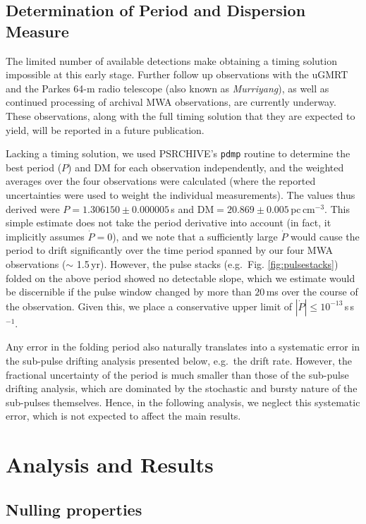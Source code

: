 \documentclass[twocolumn]{aastex631}
\newcommand{\psrdm}{20.869}
\newcommand{\psrdmerr}{0.005}
\newcommand{\dmunit}{pc$\,$cm$^{-3}$}
\begin{document}
\subsection{Determination of Period and Dispersion Measure}
\label{sec:period}

The limited number of available detections make obtaining a timing solution impossible at this early stage.
Further follow up observations with the uGMRT and the Parkes 64-m radio telescope (also known as \emph{Murriyang}), as well as continued processing of archival MWA observations, are currently underway. These observations, along with the full timing solution that they are expected to yield, will be reported in a future publication.

Lacking a timing solution, we used PSRCHIVE's \texttt{pdmp} routine to determine the best period ($P$) and DM for each observation independently, and the weighted averages over the four observations were calculated (where the reported uncertainties were used to weight the individual measurements).
The values thus derived were $P = 1.306150 \pm 0.000005\,$s and $\text{DM} = \psrdm \pm \psrdmerr\,$\dmunit.
This simple estimate does not take the period derivative into account (in fact, it implicitly assumes $\dot{P} = 0$), and we note that a sufficiently large $\dot{P}$ would cause the period to drift significantly over the time period spanned by our four MWA observations ($\sim$ 1.5\,yr).
However, the pulse stacks (e.g.\ Fig. \ref{fig:pulsestacks}) folded on the above period showed no detectable slope, which we estimate would be discernible if the pulse window changed by more than $20\,$ms over the course of the observation.
Given this, we place a conservative upper limit of $|\dot{P}| \le 10^{-13}$\,s\,s$^{-1}$.

Any error in the folding period also naturally translates into a systematic error in the sub-pulse drifting analysis presented below, e.g.\ the drift rate.
However, the fractional uncertainty of the period is much smaller than those of the sub-pulse drifting analysis, which are dominated by the stochastic and bursty nature of the sub-pulses themselves.
Hence, in the following analysis, we neglect this systematic error, which is not expected to affect the main results.

\section{Analysis and Results}
\label{sec:analysis}

\subsection{Nulling properties}
\label{sec:nulling}
\end{document}
